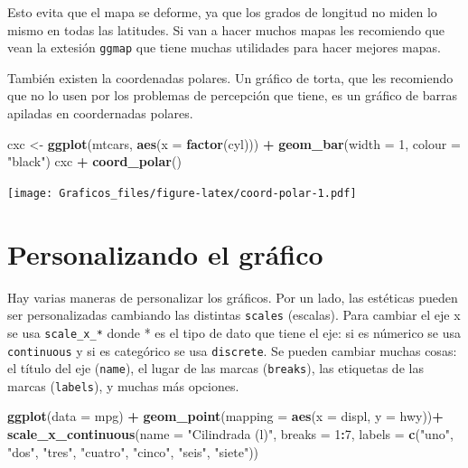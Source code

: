 \documentclass[]{book}
\newenvironment{Shaded}{\begin{snugshade}}{\end{snugshade}}
\newcommand{\DataTypeTok}[1]{\textcolor[rgb]{0.13,0.29,0.53}{#1}}
\newcommand{\DecValTok}[1]{\textcolor[rgb]{0.00,0.00,0.81}{#1}}
\newcommand{\KeywordTok}[1]{\textcolor[rgb]{0.13,0.29,0.53}{\textbf{#1}}}
\newcommand{\NormalTok}[1]{#1}
\newcommand{\OperatorTok}[1]{\textcolor[rgb]{0.81,0.36,0.00}{\textbf{#1}}}
\newcommand{\StringTok}[1]{\textcolor[rgb]{0.31,0.60,0.02}{#1}}
\theoremstyle{definition}
\theoremstyle{definition}
\theoremstyle{definition}
\theoremstyle{remark}
\begin{document}
Esto evita que el mapa se deforme, ya que los grados de longitud no
miden lo mismo en todas las latitudes. Si van a hacer muchos mapas les
recomiendo que vean la extesión \texttt{ggmap} que tiene muchas
utilidades para hacer mejores mapas.

También existen la coordenadas polares. Un gráfico de torta, que les
recomiendo que no lo usen por los problemas de percepción que tiene, es
un gráfico de barras apiladas en coordernadas polares.

\begin{Shaded}
\begin{Highlighting}[]
\NormalTok{cxc <-}\StringTok{ }\KeywordTok{ggplot}\NormalTok{(mtcars, }\KeywordTok{aes}\NormalTok{(}\DataTypeTok{x =} \KeywordTok{factor}\NormalTok{(cyl))) }\OperatorTok{+}
\StringTok{  }\KeywordTok{geom_bar}\NormalTok{(}\DataTypeTok{width =} \DecValTok{1}\NormalTok{, }\DataTypeTok{colour =} \StringTok{"black"}\NormalTok{)}
\NormalTok{cxc }\OperatorTok{+}\StringTok{ }\KeywordTok{coord_polar}\NormalTok{()}
\end{Highlighting}
\end{Shaded}

\texttt{[image: Graficos\_files/figure-latex/coord-polar-1.pdf]}

\hypertarget{personalizando-el-grafico}{%
\section{Personalizando el gráfico}\label{personalizando-el-grafico}}

Hay varias maneras de personalizar los gráficos. Por un lado, las
estéticas pueden ser personalizadas cambiando las distintas
\texttt{scales} (escalas). Para cambiar el eje x se usa
\texttt{scale\_x\_*} donde * es el tipo de dato que tiene el eje: si es
númerico se usa \texttt{continuous} y si es categórico se usa
\texttt{discrete}. Se pueden cambiar muchas cosas: el título del eje
(\texttt{name}), el lugar de las marcas (\texttt{breaks}), las etiquetas
de las marcas (\texttt{labels}), y muchas más opciones.

\begin{Shaded}
\begin{Highlighting}[]
\KeywordTok{ggplot}\NormalTok{(}\DataTypeTok{data =}\NormalTok{ mpg) }\OperatorTok{+}
\StringTok{  }\KeywordTok{geom_point}\NormalTok{(}\DataTypeTok{mapping =} \KeywordTok{aes}\NormalTok{(}\DataTypeTok{x =}\NormalTok{ displ, }\DataTypeTok{y =}\NormalTok{ hwy))}\OperatorTok{+}
\StringTok{  }\KeywordTok{scale_x_continuous}\NormalTok{(}\DataTypeTok{name =} \StringTok{"Cilindrada (l)"}\NormalTok{, }\DataTypeTok{breaks =} \DecValTok{1}\OperatorTok{:}\DecValTok{7}\NormalTok{, }
                     \DataTypeTok{labels =} \KeywordTok{c}\NormalTok{(}\StringTok{"uno"}\NormalTok{, }\StringTok{"dos"}\NormalTok{, }\StringTok{"tres"}\NormalTok{, }\StringTok{"cuatro"}\NormalTok{, }\StringTok{"cinco"}\NormalTok{, }
                                \StringTok{"seis"}\NormalTok{, }\StringTok{"siete"}\NormalTok{))}
\end{Highlighting}
\end{Shaded}
\end{document}
